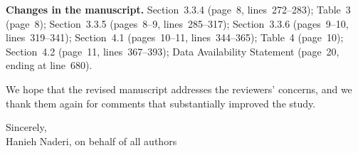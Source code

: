 \documentclass[11pt,a4paper]{article}
\begin{document}
\textbf{Changes in the manuscript.} Section~3.3.4 (page~8, lines~272--283); Table~3 (page~8); Section~3.3.5 (pages~8--9, lines~285--317); Section~3.3.6 (pages~9--10, lines~319--341); Section~4.1 (pages~10--11, lines~344--365); Table~4 (page~10); Section~4.2 (page~11, lines~367--393); Data Availability Statement (page~20, ending at line~680).

\bigskip
We hope that the revised manuscript addresses the reviewers' concerns, and we thank them again for comments that substantially improved the study.

\medskip
Sincerely,\\
Hanieh Naderi, on behalf of all authors
\end{document}
